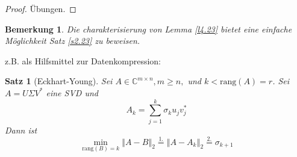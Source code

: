 \documentclass{book}
\newtheorem{theorem}[algorithm]{Satz}
\newtheorem{remark}[algorithm]{Bemerkung}
\def\C{\mathbb{C}}
\def\rang{\text{rang}}
\begin{document}
            \begin{proof}
                Übungen.
            \end{proof}

            \begin{remark}\label{b4.24}
                Die charakterisierung von Lemma \ref{l4.23} bietet eine einfache Möglichkeit Satz \ref{s2.23} zu beweisen.
            \end{remark}

            z.B. als Hilfsmittel zur Datenkompression:

            \begin{theorem}[Eckhart-Young]\label{s4.25}
                Sei $A\in\C^{m\times n},m\geq n,$ und $k<\rang(A)=r$. Sei $A=U\Sigma V^*$
                eine SVD und 
                \begin{equation*}
                    A_k=\sum_{j=1}^k \sigma_k u_j v_j^*
                \end{equation*}
                Dann ist 
                \begin{equation*}
                    \min_{\rang(B)=k} \left\Vert A-B \right\Vert_2 \stackrel{1.}{=} \left\Vert A-A_k \right\Vert_2 \stackrel{2.}{=} \sigma_{k+1}
                \end{equation*}
            \end{theorem}
\end{document}
